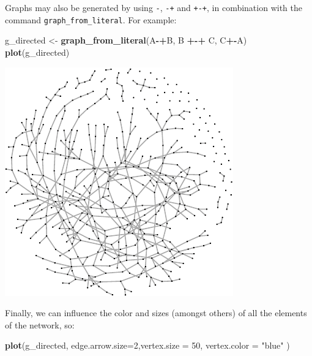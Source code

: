 \documentclass[]{article}
\newenvironment{Shaded}{\begin{snugshade}}{\end{snugshade}}
\newcommand{\KeywordTok}[1]{\textcolor[rgb]{0.13,0.29,0.53}{\textbf{#1}}}
\newcommand{\DataTypeTok}[1]{\textcolor[rgb]{0.13,0.29,0.53}{#1}}
\newcommand{\DecValTok}[1]{\textcolor[rgb]{0.00,0.00,0.81}{#1}}
\newcommand{\StringTok}[1]{\textcolor[rgb]{0.31,0.60,0.02}{#1}}
\newcommand{\OperatorTok}[1]{\textcolor[rgb]{0.81,0.36,0.00}{\textbf{#1}}}
\newcommand{\NormalTok}[1]{#1}
\theoremstyle{definition}
\theoremstyle{definition}
\theoremstyle{definition}
\theoremstyle{remark}
\begin{document}
Graphs may also be generated by using \texttt{-}, \texttt{-+} and
\texttt{+-+}, in combination with the command
\texttt{graph\_from\_literal}. For example:

\begin{Shaded}
\begin{Highlighting}[]
\NormalTok{g_directed <-}\StringTok{ }\KeywordTok{graph_from_literal}\NormalTok{(A}\OperatorTok{-+}\NormalTok{B, B }\OperatorTok{+-+}\StringTok{ }\NormalTok{C, C}\OperatorTok{+-}\NormalTok{A)}
\KeywordTok{plot}\NormalTok{(g_directed)}
\end{Highlighting}
\end{Shaded}

\includegraphics{ResearchTools_files/figure-latex/unnamed-chunk-55-1.pdf}

Finally, we can influence the color and sizes (amongst others) of all
the elements of the network, so:

\begin{Shaded}
\begin{Highlighting}[]
\KeywordTok{plot}\NormalTok{(g_directed, }\DataTypeTok{edge.arrow.size=}\DecValTok{2}\NormalTok{,}\DataTypeTok{vertex.size =} \DecValTok{50}\NormalTok{, }\DataTypeTok{vertex.color =} \StringTok{"blue"}\NormalTok{ )}
\end{Highlighting}
\end{Shaded}
\end{document}
